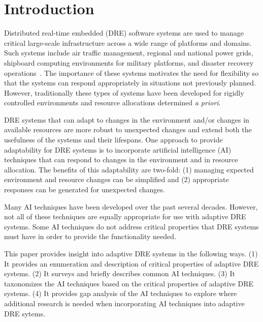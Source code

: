 \documentclass[conference]{IEEEtran}
\begin{document}
\section{Introduction}
\label{intro}
Distributed real-time embedded (DRE) software systems are used to manage critical large\--scale infrastructure across a wide range of platforms and domains. Such systems include air traffic management, regional and national power grids, shipboard computing environments for military platforms, and disaster recovery operations~\cite{Hoffert:11}. The importance of these systems motivates the need for flexibility so that the systems can respond appropriately in situations not previously planned. However, traditionally these types of systems have been developed for rigidly controlled environments and resource allocations determined \emph{a priori}.

DRE systems that can adapt to changes in the environment and/or changes in available resources are more robust to unexpected changes and extend both the usefulness of the systems and their lifespans. One approach to provide adaptability for DRE systems is to incorporate artificial intelligence (AI) techniques that can respond to changes in the environment and in resource allocation. The benefits of this adaptability are two-fold: (1) managing expected environment and resource changes can be simplified and (2) appropriate responses can be generated for unexpected changes. 

Many AI techniques have been developed over the past several decades. However, not all of these techniques are equally appropriate for use with adaptive DRE systems. Some AI techniques do not address critical properties that DRE systems must have in order to provide the functionality needed.

This paper provides insight into adaptive DRE systems in the following ways. (1) It provides an enumeration and description of critical properties of adaptive DRE systems. (2) It surveys and briefly describes common AI techniques. (3) It taxonomizes the AI techniques based on the critical properties of adaptive DRE systems. (4) It provides gap analysis of the AI techniques to explore where additional research is needed when incorporating AI techniques into adaptive DRE sytems.
\end{document}
